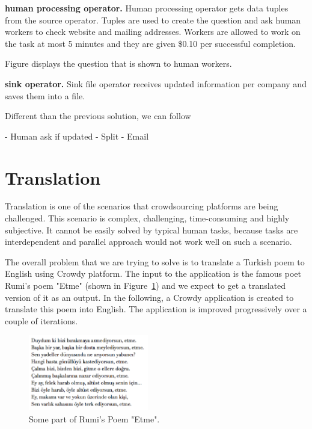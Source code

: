 \textbf{human processing operator.}
Human processing operator gets data tuples from the source operator. Tuples are used to create the question and ask human workers to check website and mailing addresses. Workers are allowed to work on the task at most 5 minutes and they are given \$0.10 per successful completion.

Figure displays the question that is shown to human workers.


\textbf{sink operator.}
Sink file operator receives updated information per company and saves them into a file.



Different than the previous solution, we can follow 

- Human ask if updated
- Split
- Email


\section{Translation}
Translation is one of the scenarios that crowdsourcing platforms are being challenged. This scenario is complex, challenging, time-consuming and highly subjective. It cannot be easily solved by typical human tasks, because tasks are interdependent and parallel approach would not work well on such a scenario.

The overall problem that we are trying to solve is to translate a Turkish poem to English using Crowdy platform. The input to the application is the famous poet Rumi's poem "Etme" (shown in Figure~\ref{fig:scenario2.poem}) and we expect to get a translated version of it as an output. In the following, a Crowdy application  is created to translate this poem into English. The application is improved progressively over a couple of iterations.

\begin{figure}[ht]
	\centering
	\includegraphics[height=125px]{figures/scenarios/poem.png}
	\caption{Some part of Rumi's Poem "Etme".}
	\label{fig:scenario2.poem}
\end{figure}

